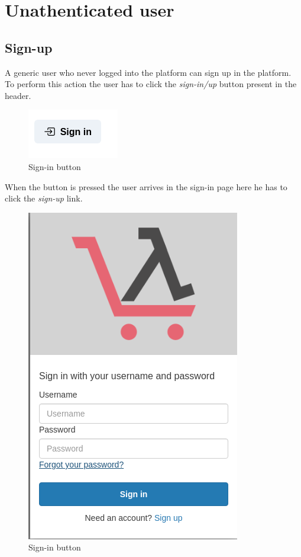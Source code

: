 \section{Unathenticated user}
\subsection{Sign-up}
A generic user who never logged into the platform can sign up in the platform. To perform this action the user has to click the \textit{sign-in/up} button present in the header.
\begin{figure}[!ht]
    \caption{Sign-in button}
    \vspace{10px}
    \includegraphics[scale=0.5]{../../../../Images/userManual/signInButton.png}
    \centering
\end{figure}
When the button is pressed the user arrives in the sign-in page here he has to click the \textit{sign-up} link.
\begin{figure}[!ht]
    \caption{Sign-in button}
    \vspace{10px}
    \includegraphics[scale=0.3]{../../../../Images/userManual/singIN.png}
    \centering
\end{figure}
